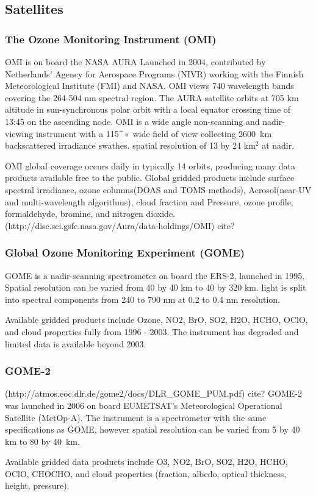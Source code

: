 \subsection{Satellites}

\subsubsection{The Ozone Monitoring Instrument (OMI)}
OMI is on board the NASA AURA Launched in 2004, contributed by Netherlands' Agency for Aerospace Programs (NIVR) working with the Finnish Meteorological Institute (FMI) and NASA. OMI views 740 wavelength bands covering the 264-504 nm spectral region.
The AURA satellite orbits at 705 km altitude in sun-synchronous polar orbit with a local equator crossing time of 13:45 on the ascending node.
OMI is a wide angle non-scanning and nadir-viewing instrument with a 115$\^{\circ}$ wide field of view collecting 2600~km backscattered irradiance swathes. spatial resolution of 13 by 24 km$^2$ at nadir. 

OMI global coverage occurs daily in typically 14 orbits, producing many data products available free to the public.
Global gridded products include surface spectral irradiance, ozone columns(DOAS and TOMS methods), Aerosol(near-UV and multi-wavelength algorithms), cloud fraction and Pressure, ozone profile, formaldehyde, bromine, and nitrogen dioxide.
(http://disc.sci.gsfc.nasa.gov/Aura/data-holdings/OMI) cite?

\subsubsection{Global Ozone Monitoring Experiment (GOME)}

GOME is a nadir-scanning spectrometer on board the ERS-2, launched in 1995.
Spatial resolution can be varied from 40 by 40 km to 40 by 320 km.
light is split into spectral components from 240 to 790 nm at 0.2 to 0.4 nm resolution.

Available gridded products include Ozone, NO2, BrO, SO2, H2O, HCHO, OClO, and cloud properties fully from 1996 - 2003. The instrument has degraded and limited data is available beyond 2003. 

\subsubsection{GOME-2}
(http://atmos.eoc.dlr.de/gome2/docs/DLR_GOME_PUM.pdf) cite?
GOME-2 was launched in 2006 on board EUMETSAT's Meteorological Operational Satellite (MetOp-A). 
The instrument is a spectrometer with the same specifications as GOME, however spatial resolution can be varied from 5 by 40 km to 80 by 40~km.

Available gridded data products include O3, NO2, BrO, SO2, H2O, HCHO, OClO, CHOCHO, and cloud properties (fraction, albedo, optical thickness, height, pressure).
  